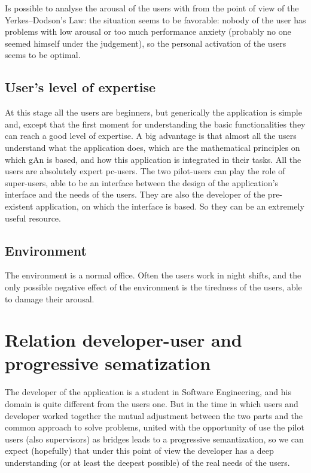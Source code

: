 Is possible to analyse the arousal of the users with from the point of view of the Yerkes–Dodson's Law: the situation seems to be favorable: nobody of the user 
has problems with low arousal or too much performance anxiety (probably no one seemed himself under the judgement), so the personal activation of the users seems to be optimal.

\subsection{User's level of expertise }
At this stage all the users are beginners, but generically the application is simple and, except that the first moment for understanding the basic functionalities they can reach a good level of expertise. A big advantage is that almost all the users understand what the application does, which are the mathematical principles on which gAn is based, and how this application is integrated in their tasks.   
All the users are absolutely expert pc-users.
The two pilot-users can play the role of super-users, able to be an interface between the design of the application's interface and the needs of the users. They are also the developer of the pre-existent application, on which the interface is based. So they can be an extremely useful resource.  


\subsection{Environment }
The environment is a normal office. Often the users work in night shifts, and the only possible negative effect of the environment is the tiredness of the users, able to damage their arousal. 

\section{Relation developer-user and progressive sematization}
The developer of the application is a student in Software Engineering, and his domain is quite different from the users one. But in the time in which users and developer worked together the mutual adjustment between the two parts and the common approach to solve problems, united with the opportunity of use the pilot users (also supervisors) as bridges leads to a progressive semantization, so we can expect (hopefully) that under this point of view the developer has a deep understanding (or at least the deepest possible) of the real needs of the users.

